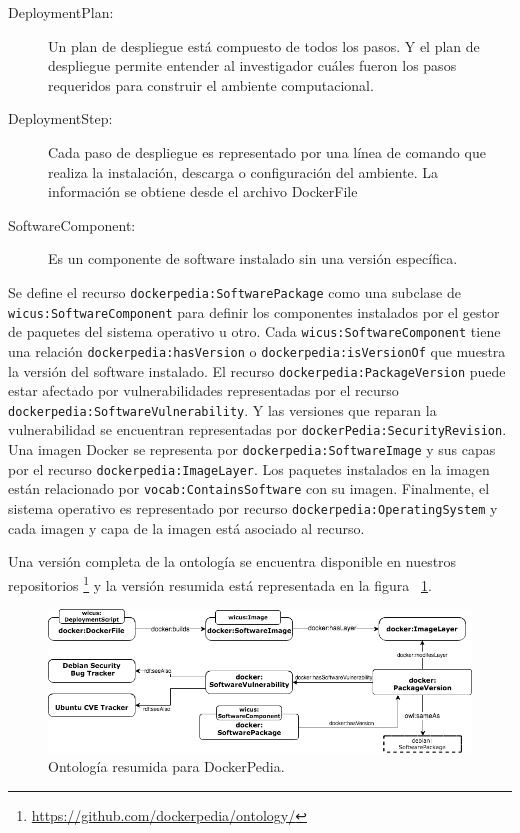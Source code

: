 \begin{description}
	\item [DeploymentPlan:]  Un plan de despliegue está compuesto de todos los pasos. Y el plan de despliegue permite entender al investigador cuáles fueron los pasos requeridos para construir el ambiente computacional.
	\item [DeploymentStep:] Cada paso de despliegue es representado por una línea de comando que realiza la instalación, descarga o configuración del ambiente. La información se obtiene desde el archivo DockerFile
	\item [SoftwareComponent:] Es un componente de software instalado sin una versión específica. 
\end{description} 

Se define el recurso \verb|dockerpedia:SoftwarePackage| como una subclase de \verb|wicus:SoftwareComponent| para definir los componentes instalados por el gestor de paquetes del sistema operativo u otro.
Cada \verb|wicus:SoftwareComponent| tiene una relación \verb|dockerpedia:hasVersion| o \verb|dockerpedia:isVersionOf| que muestra la versión del software instalado.
El recurso \verb|dockerpedia:PackageVersion| puede estar afectado por vulnerabilidades representadas por el recurso \verb|dockerpedia:SoftwareVulnerability|. Y las versiones que reparan la vulnerabilidad se encuentran representadas por \verb|dockerPedia:SecurityRevision|.
Una imagen Docker se representa por \verb|dockerpedia:SoftwareImage| y sus capas por el recurso \verb|dockerpedia:ImageLayer|. Los paquetes instalados en la imagen están relacionado por \verb|vocab:ContainsSoftware| con su imagen.
Finalmente, el sistema operativo es representado por recurso \verb|dockerpedia:OperatingSystem| y cada imagen y capa de la imagen está asociado al recurso.

Una versión completa de la ontología se encuentra disponible en nuestros repositorios \footnote{\url{https://github.com/dockerpedia/ontology/}} y la versión resumida está representada en la figura ~\ref{fig:ontology}. 

\begin{figure}[t]
  \centering
    \includegraphics[width=1\textwidth]{Figures/dockerOntologyBasic.png}
      \caption{Ontología resumida para DockerPedia.}
     \label{fig:ontology}

\end{figure}

